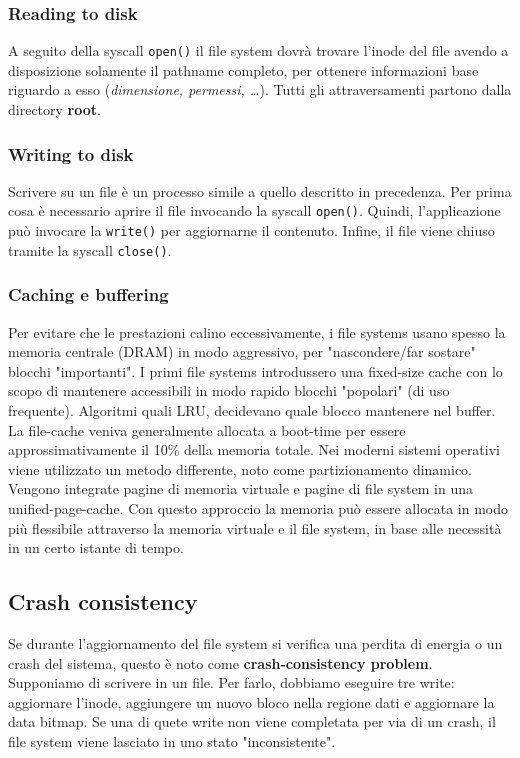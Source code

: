 \documentclass[12pt, letterpaper]{article}
\begin{document}
			\subsubsection{Reading to disk}
				A seguito della syscall \texttt{open()} il file system dovrà trovare l'inode del file avendo a disposizione solamente il pathname completo, per ottenere informazioni base riguardo a esso (\textit{dimensione, permessi, \dots}). Tutti gli attraversamenti partono dalla directory \textbf{root}. 
				
			\subsubsection{Writing to disk}
				Scrivere su un file è un processo simile a quello descritto in precedenza. Per prima cosa è necessario aprire il file invocando la syscall \texttt{open()}. Quindi, l’applicazione può invocare la \texttt{write()} per aggiornarne il contenuto. Infine, il file viene chiuso tramite la syscall \texttt{close()}. 
				
			\subsubsection{Caching e buffering}
				Per evitare che le prestazioni calino eccessivamente, i file systems usano spesso la memoria centrale (DRAM) in modo aggressivo, per "nascondere/far sostare" blocchi "importanti". I primi file systems introdussero una fixed-size cache con lo scopo di mantenere accessibili in modo rapido blocchi "popolari" (di uso frequente). Algoritmi quali LRU, decidevano quale blocco mantenere nel buffer. La file-cache veniva generalmente allocata a boot-time per essere approssimativamente il 10\% della memoria totale. Nei moderni sistemi operativi viene utilizzato un metodo differente, noto come partizionamento dinamico. Vengono integrate pagine di memoria virtuale e pagine di file system in una unified-page-cache. Con questo approccio la memoria può essere allocata in modo più flessibile attraverso la memoria virtuale e il file system, in base alle necessità in un certo istante di tempo.
				
		
		\subsection{Crash consistency}
			Se durante l'aggiornamento del file system si verifica una perdita di energia o un crash del sistema, questo è noto come \textbf{crash-consistency problem}. Supponiamo di scrivere in un file. Per farlo, dobbiamo eseguire tre write: aggiornare l'inode, aggiungere un nuovo bloco nella regione dati e aggiornare la data bitmap. Se una di quete write non viene completata per via di un crash, il file system viene lasciato in uno stato "inconsistente". 
			
\end{document}
